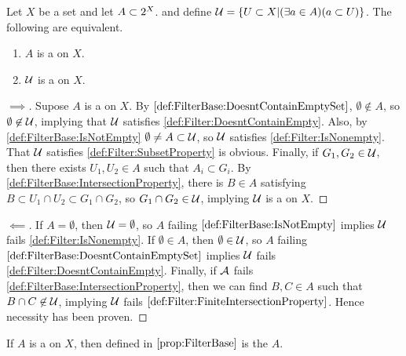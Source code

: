 \begin{prop}
    \label{prop:FilterBase}
    Let $X$ be a set and let 
    $A \subset 2^{X}$. 
    and define 
    $\mathcal{U}=\{U \subset X | (\exists a \in A ) ( a \subset U ) \}$. 
    The following are equivalent. 
    \begin{enumerate}
    \item $A$ is a \FilterBase on $X$. 
    \item $\mathcal{U}$ is a \Filter on $X$. 
    \end{enumerate}
    \begin{proof}[$\implies$]
    Supose $A$ is a \FilterBase on $X$.
    By $\ref{def:FilterBase:DoesntContainEmptySet}$, $\emptyset \not \in A$, so 
    $\emptyset \not \in \mathcal{U}$, implying that $\mathcal{U}$ satisfies
    \ref{def:Filter:DoesntContainEmpty}. 
    Also, by \ref{def:FilterBase:IsNotEmpty} $\emptyset \neq A \subset \mathcal{U}$, so $\mathcal{U}$ satisfies
    \ref{def:Filter:IsNonempty}. That $\mathcal{U}$ satisfies \ref{def:Filter:SubsetProperty} is obvious. 
    Finally, if $G_1,G_2 \in \mathcal{U}$, then there exists $U_1,U_2 \in A$ such that $A_i \subset G_i$. 
    By \ref{def:FilterBase:IntersectionProperty}, there is $B \in A$ satisfying 
    $B \subset U_1 \cap U_2 \subset G_1 \cap G_2$, so $G_1 \cap G_2 \in \mathcal{U}$, implying $\mathcal{U}$ is a \Filter on $X$. 
    \end{proof}
    \begin{proof}[$\impliedby$]
        If $A = \emptyset$, then $\mathcal{U}=\emptyset$, so $A$ failing $\ref{def:FilterBase:IsNotEmpty}$ implies $\mathcal{U}$ fails \ref{def:Filter:IsNonempty}. 
        If $\emptyset \in A$, then $\emptyset \in \mathcal{U}$, so $A$ failing $\ref{def:FilterBase:DoesntContainEmptySet}$ implies $\mathcal{U}$ fails \ref{def:Filter:DoesntContainEmpty}. 
        Finally, if $\mathcal{A}$ fails \ref{def:FilterBase:IntersectionProperty}, then 
        we can find $B,C \in A$ such that $B \cap C \not \in \mathcal{U}$, implying $\mathcal{U}$ fails $\ref{def:Filter:FiniteIntersectionProperty}$. 
        Hence necessity has been proven. 
    \end{proof}
\end{prop}
\begin{rmk}
\label{rmk:FilterBase}
    If $A$ is a \FilterBase on $X$, then \scU defined in $\ref{prop:FilterBase}$ 
    is the \FilterGeneratedBy $A$. 
\end{rmk}
